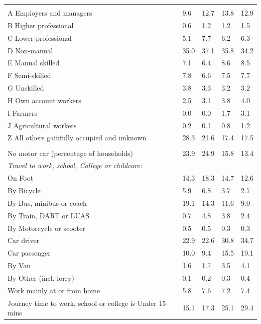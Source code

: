 \documentclass{article}
\begin{document}
\begin{table}[h]
\begin{tabular}{KTTTT}
\hline
    \\ 
    \hline
A Employers and managers &  9.6& 12.7& 13.8& 12.9\\
B Higher professional & 0.6& 1.2& 1.2& 1.5\\
C Lower professional & 5.1& 7.7& 6.2& 6.3\\
D Non-manual & 35.0& 37.1& 35.8& 34.2\\
E Manual skilled & 7.1& 6.4& 8.6& 8.5\\
F Semi-skilled & 7.8& 6.6& 7.5& 7.7\\
G Unskilled & 3.8& 3.3& 3.2& 3.2\\
H Own account workers & 2.5& 3.1& 3.8& 4.0\\
I Farmers & 0.0& 0.0& 1.7& 3.1\\
J Agricultural workers & 0.2& 0.1& 0.8& 1.2\\
Z All others gainfully occupied and unknown & 28.3& 21.6& 17.4& 17.5\\
\hline
{}\hline
    \\ 
    \hline
No motor car (percentage of households) & 23.9& 24.9& 15.8& 
13.4\\
    \hline 
\emph{Travel to work, school, College or childcare:} & & & \\
\quad On Foot & 14.3& 18.3& 14.7& 12.6\\ 
\quad By Bicycle & 5.9& 6.8& 3.7& 2.7\\ 
\quad By Bus, minibus or coach & 19.1& 14.3& 11.6&  9.0\\
\quad By Train, DART or LUAS & 0.7& 4.8& 3.8& 2.4\\
\quad By Motorcycle or scooter & 0.5& 0.5& 0.3& 0.3\\
\quad Car driver & 22.9 & 22.6& 30.8& 34.7\\
\quad Car passenger & 10.0&  9.4& 15.5& 19.1\\
\quad By Van & 1.6& 1.7& 3.5& 4.1\\
\quad By Other (incl. lorry) & 0.1& 0.2& 0.3& 0.4\\
    \hline
Work mainly at or from home & 5.8& 7.6& 7.2& 7.4\\
Journey time to work, school or college is Under 15 mins & 15.1& 17.3& 25.1& 29.4\\

\end{tabular}
\end{table}
\end{document}
